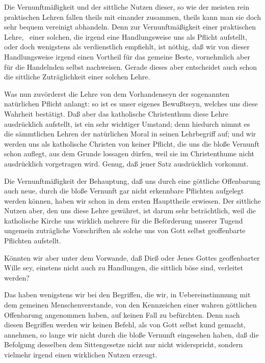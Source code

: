 Die Vernunftmäßigkeit und der sittliche Nutzen dieser, so wie der meisten rein praktischen Lehren fallen theils mit einander zusammen, theils kann man sie doch sehr bequem vereinigt abhandeln. Denn zur Vernunftmäßigkeit einer praktischen Lehre, \dh\  einer solchen, die irgend eine Handlungsweise uns als Pflicht aufstellt, oder doch wenigstens als verdienstlich empfiehlt, ist nöthig, daß wir von dieser Handlungsweise irgend einen Vortheil für das gemeine Beste, vornehmlich aber für die Handelnden selbst nachweisen. Gerade dieses aber entscheidet auch schon die sittliche Zuträglichkeit einer solchen Lehre.
\begin{aufza}
\item Was nun zuvörderst die Lehre von dem Vorhandenseyn der sogenannten natürlichen Pflicht anlangt: so ist es unser eigenes Bewußtseyn, welches uns diese Wahrheit bestätigt. Daß aber das katholische Christenthum diese Lehre ausdrücklich aufstellt, ist ein sehr wichtiger Umstand; denn hiedurch nimmt es die sämmtlichen Lehren der natürlichen Moral in seinen Lehrbegriff auf; und wir werden uns als katholische Christen von keiner Pflicht, die uns die bloße Vernunft schon auflegt, aus dem Grunde lossagen dürfen, weil sie im Christenthume nicht ausdrücklich vorgetragen wird. Genug, daß jener Satz ausdrücklich vorkommt.
\item Die Vernunftmäßigkeit der Behauptung, daß uns durch eine göttliche Offenbarung auch neue, durch die bloße Vernunft gar nicht erkennbare Pflichten aufgelegt werden können, haben wir schon in dem ersten Haupttheile erwiesen. Der sittliche Nutzen aber, den uns diese Lehre gewähret, ist darum sehr beträchtlich, weil die katholische Kirche uns wirklich mehrere für die Beförderung unserer Tugend ungemein zuträgliche Vorschriften als solche uns von Gott selbst geoffenbarte Pflichten aufstellt.\par
{} Könnten wir aber unter dem Vorwande, daß Dieß oder Jenes Gottes geoffenbarter Wille sey, einstens nicht auch zu Handlungen, die sittlich böse sind, verleitet werden?\par
{} Das haben wenigstens wir bei den Begriffen, die wir, in Uebereinstimmung mit dem gemeinen Menschenverstande, von den Kennzeichen einer wahren göttlichen Offenbarung angenommen haben, auf keinen Fall zu befürchten. Denn nach diesen Begriffen werden wir keinen Befehl, als von Gott selbst kund gemacht, annehmen, so lange wir nicht durch die bloße Vernunft eingesehen haben, daß die Befolgung desselben dem Sittengesetze nicht nur nicht widerspricht, sondern vielmehr irgend einen wirklichen Nutzen erzeugt.
\end{aufza}

